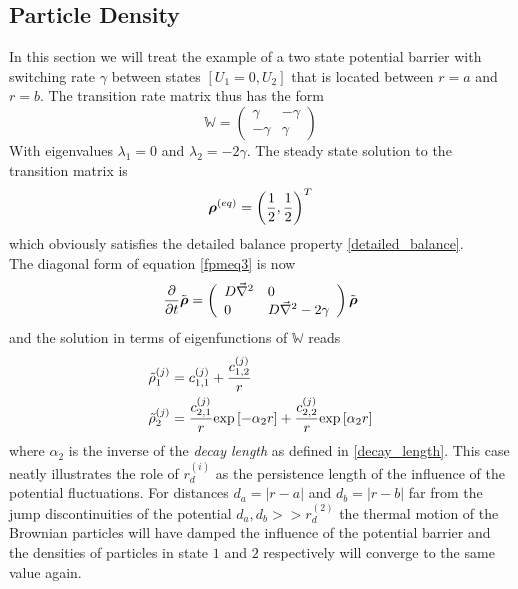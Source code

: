 \subsection{Particle Density}
In this section we will treat the example of a two state potential barrier with switching rate $\gamma$ between states $[U_1=0,U_2]$ that is located between $r = a$ and $r = b$. The transition rate matrix thus has the form 
\begin{equation}
    \mathbb{W} = \left( \begin{array}{rr}
    \gamma & -\gamma \\
    -\gamma & \gamma 
\end{array} \right)
    \label{two_state_transition_matrix}
\end{equation}
With eigenvalues $\lambda_1 = 0$ and $\lambda_2 = -2\gamma$. The steady state solution to the transition matrix is 
\begin{equation}
    \boldsymbol{\mathbf{\rho}}^{(eq)}=\left(\frac{1}{2}, \frac{1}{2}\right)^{T}
    \label{rhoeq}
\end{equation}
which obviously satisfies the detailed balance property \eqref{detailed_balance}. \\
The diagonal form of equation \eqref{fpmeq3} is now 
\begin{equation}
    \frac{\partial}{\partial t} \tilde{\boldsymbol{\mathbf{\rho}}} = \left( \begin{array}{ll}
        D\vec{\nabla}^{2} & 0 \\
        0 & D\vec{\nabla}^{2} - 2\gamma 
    \end{array} \right) \tilde{\boldsymbol{\mathbf{\rho}}}
    \label{fpmeq5}
\end{equation}
and the solution in terms of eigenfunctions of $\mathbb{W}$ reads
\begin{align}
    \tilde{\rho}_1^{(j)} &= c_{1,1}^{(j)} + \frac{c_{1,2}^{(j)}}{r} \\
    \tilde{\rho}_2^{(j)} &= \frac{c_{2,1}^{(j)}}{r}{\rm exp}\left[-\alpha_2r\right]+ \frac{c_{2,2}^{(j)}}{r}{\rm exp}\left[\alpha_2 r\right]
    \label{ind_sol_U2}
\end{align}
where $\alpha_2$ is the inverse of the \textit{decay length} as defined in \eqref{decay_length}. This case neatly illustrates the role of $r_d^{(i)}$ as the persistence length of the influence of the potential fluctuations. For distances $d_a = |r - a|$ and $d_b = |r - b|$ far from the jump discontinuities of the potential $d_a, d_b >> r_d^{(2)}$ the thermal motion of the Brownian particles will have damped the influence of the potential barrier and the densities of particles in state $1$ and $2$ respectively will converge to the same value again.\\
